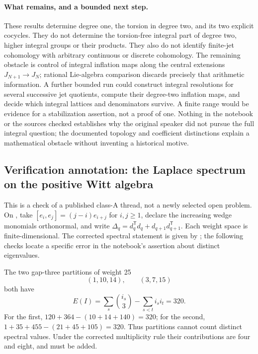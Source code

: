 \paragraph{What remains, and a bounded next step.}
These results determine degree one, the torsion in degree two, and its two
explicit cocycles. They do not determine the torsion-free integral part of
degree two, higher integral groups or their products. They also do not
identify finite-jet cohomology with arbitrary continuous or discrete
cohomology. The remaining obstacle is control of integral inflation maps
along the central extensions \(J_{N+1}\to J_N\); rational Lie-algebra
comparison discards precisely that arithmetic information. A further
bounded run could construct integral resolutions for several successive
jet quotients, compute their degree-two inflation maps, and decide which
integral lattices and denominators survive. A finite range would be
evidence for a stabilization assertion, not a proof of one. Nothing in
the notebook or the sources checked establishes why the original speaker
did not pursue the full integral question; the documented topology and
coefficient distinctions explain a mathematical obstacle without inventing
a historical motive.

\subsection{Verification annotation: the Laplace spectrum on the positive Witt algebra}
\label{dev:1977-laplacian-check}
This is a check of a published class-A thread, not a newly selected open
problem. On , take
\([e_i,e_j]=(j-i)e_{i+j}\) for \(i,j\geq1\), declare the increasing wedge
monomials orthonormal, and write
\(\Delta_q=d_q^{\mathsf T}d_q+d_{q+1}d_{q+1}^{\mathsf T}\).
Each weight space is finite-dimensional. The corrected spectral statement
is given by \citet[Theorem~2, p.~324]{fuchswilmarth2010laplacian}; the following checks locate a
specific error in the notebook's assertion about distinct eigenvalues.

\begin{example}\oursComputed{}
The two gap-three partitions of weight 25
\[
 (1,10,14),\qquad(3,7,15)
\]
both have
\[
 E(I)=\sum_s\binom{i_s}{3}-\sum_{s<t}i_si_t=320.
\]
For the first, \(120+364-(10+14+140)=320\); for the second,
\(1+35+455-(21+45+105)=320\). Thus partitions cannot count
distinct spectral values. Under the corrected multiplicity rule their
contributions are four and eight, and must be added.
\end{example}

